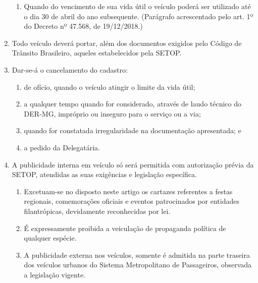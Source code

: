 \begin{enumerate}[resume, label=Art. \arabic*]
\begin{enumerate}[label= \S \arabic*]
\item Quando do vencimento de sua vida útil o veículo poderá ser utilizado até o dia 30 de abril do ano subsequente. (Parágrafo acrescentado pelo art. 1º do Decreto nº 47.568, de 19/12/2018.)

\end{enumerate}

\item Todo veículo deverá portar, além dos documentos exigidos pelo Código de Trânsito Brasileiro, aqueles estabelecidos pela SETOP.

\item Dar-se-á o cancelamento do cadastro:

\begin{enumerate}[label=\roman*.]

\item de ofício, quando o veículo atingir o limite da vida útil;

\item a qualquer tempo quando for considerado, através de laudo técnico do DER-MG, impróprio ou inseguro para o serviço ou a via;

\item quando for constatada irregularidade na documentação apresentada; e

\item a pedido da Delegatária.

\end{enumerate}

\item A publicidade interna em veículo só será permitida com autorização prévia da SETOP, atendidas as suas exigências e legislação específica.

\begin{enumerate}[label= \S \arabic*] %

\item Excetuam-se no disposto neste artigo os cartazes referentes a festas regionais, comemorações oficiais e eventos patrocinados por entidades filantrópicas, devidamente reconhecidas por lei.

\item É expressamente proibida a veiculação de propaganda política de qualquer espécie.

\item A publicidade externa nos veículos, somente é admitida na parte traseira dos veículos urbanos do Sistema Metropolitano de Passageiros, observada a legislação vigente.

\end{enumerate}


\end{enumerate}

